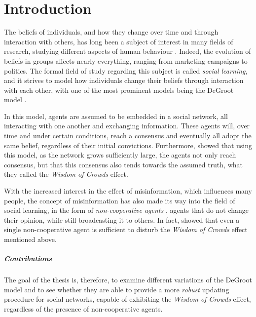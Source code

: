 \documentclass[a4paper, 12pt]{report}
\begin{document}
\newpage

\setcounter{page}{1}


\chapter{Introduction}

The beliefs of individuals, and how they change over time and through interaction with others, has long been a subject of interest in many fields of research, studying different aspects of human behaviour \parencite{reed2010sociallearning}. Indeed, the evolution of beliefs in groups affects nearly everything, ranging from marketing campaigns to politics. The formal field of study regarding this subject is called \emph{social learning}, and it strives to model how individuals change their beliefs through interaction with each other, with one of the most prominent models being the DeGroot model \parencite{degroot1974concensus}. 

In this model, agents are assumed to be embedded in a social network, all interacting with one another and exchanging information. These agents will, over time and under certain conditions, reach a consensus and eventually all adopt the same belief, regardless of their initial convictions. Furthermore, \cite{golub2010naive} showed that using this model, as the network grows sufficiently large, the agents not only reach consensus, but that this consensus also tends towards the assumed truth, what they called the \emph{Wisdom of Crowds} effect.

With the increased interest in the effect of misinformation, which influences many people, the concept of misinformation has also made its way into the field of social learning, in the form of \emph{non-cooperative agents} \parencite{amir2021robust}, agents that do not change their opinion, while still broadcasting it to others. In fact, \cite{amir2021robust} showed that even a single non-cooperative agent is sufficient to disturb the \emph{Wisdom of Crowds} effect mentioned above.

\paragraph{Contributions} The goal of the thesis is, therefore, to examine different variations of the DeGroot model and to see whether they are able to provide a more \emph{robust} \parencite{amir2021robust} updating procedure for social networks, capable of exhibiting the \emph{Wisdom of Crowds} effect, regardless of the presence of non-cooperative agents.
\end{document}
